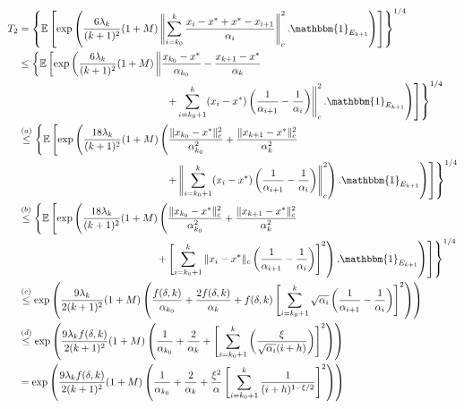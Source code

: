 \documentclass[letterpaper, 10 pt]{article}
\newcommand{\E}{\mathbb{E}}
\begin{document}
\begin{align*}
    T_2&=\left\{\E\left[\exp\left(\frac{6\lambda_k}{(k+1)^2}(1+M) \left\| \sum\limits_{i=k_0}^{k} \frac{x_i-x^*+x^*-x_{i+1}}{\alpha_i} \right\|^2_c.\mathbbm{1}_{E_{k+1}} \right)\right]\right\}^{1/4} \\
    &\leq \left\{\E\left[\exp\left(\frac{6\lambda_k}{(k+1)^2}(1+M) \left\| \frac{x_{k_0}-x^*}{\alpha_{k_0}} - \frac{x_{k+1}-x^*}{\alpha_k} \right.\right.\right.\right.\\
    &\quad\quad \quad \quad\quad \quad\quad \quad\quad \quad\quad \quad\quad \quad\left.\left. \left.\left.+\sum\limits_{i=k_0+1}^{k} (x_i-x^*)\left(\frac{1}{\alpha_{i+1}} -\frac{1}{\alpha_i} \right) \right\|^2_c.\mathbbm{1}_{E_{k+1}} \right)\right]\right\}^{1/4} \\
    &\overset{(a)}{\leq} \left\{\E\left[\exp\left(\frac{18\lambda_k}{(k+1)^2}(1+M) \left( \frac{\|x_{k_0}-x^*\|^2_c}{\alpha_{k_0}^2} + \frac{\|x_{k+1}-x^*\|^2_c}{\alpha_k^2}\right.\right.\right.\right.\\
    &\quad\quad \quad\quad \quad\quad \quad\quad \quad\quad \quad\quad \quad\quad\left.\left. \left.\left.+\left\| \sum\limits_{i=k_0+1}^{k} (x_i-x^*) \left(\frac{1}{\alpha_{i+1}} -\frac{1}{\alpha_i} \right)\right\|^2_c \right).\mathbbm{1}_{E_{k+1}} \right)\right]\right\}^{1/4}\\
    &\overset{(b)}{\leq} \left\{\E\left[\exp\left(\frac{18\lambda_k}{(k+1)^2}(1+M) \left( \frac{\|x_{k_0}-x^*\|^2_c}{\alpha_{k_0}^2} + \frac{\|x_{k+1}-x^*\|^2_c}{\alpha_k^2}\right.\right.\right.\right.\\
    &\quad\quad \quad\quad \quad\quad \quad\quad \quad\quad \quad\quad \quad\left.\left. \left.\left.+\left[\sum\limits_{i=k_0+1}^{k} \|x_i- x^*\|_c\left(\frac{1}{\alpha_{i+1}} -\frac{1}{\alpha_i} \right)\right]^2 \right).\mathbbm{1}_{E_{k+1}} \right)\right]\right\}^{1/4}\\
    &\overset{(c)}{\leq} \exp\left(\frac{9\lambda_k}{2(k+1)^2}(1+M) \left( \frac{f(\delta,k)}{\alpha_{k_0}} + \frac{2f(\delta,k)}{\alpha_k} +f(\delta,k)\left[\sum\limits_{i=k_0+1}^{k} \sqrt{\alpha_i }\left(\frac{1}{\alpha_{i+1}} -\frac{1}{\alpha_i} \right)\right]^2 \right) \right)\\
    &\overset{(d)}{\leq} \exp\left(\frac{9\lambda_kf(\delta,k)}{2(k+1)^2}(1+M) \left( \frac{1}{\alpha_{k_0}} + \frac{2}{\alpha_k} +\left[\sum\limits_{i=k_0+1}^{k} \left(\frac{\xi }{\sqrt{\alpha_i } (i+h)} \right)\right]^2 \right) \right)\\
    &= \exp\left(\frac{9\lambda_kf(\delta,k)}{2(k+1)^2}(1+M) \left( \frac{1}{\alpha_{k_0}} + \frac{2}{\alpha_k} +\frac{\xi^2}{\alpha}\left[\sum\limits_{i=k_0+1}^{k} \frac{1 }{ (i+h)^{1-\xi/2}} \right]^2 \right) \right)\\

\end{align*}
\end{document}
